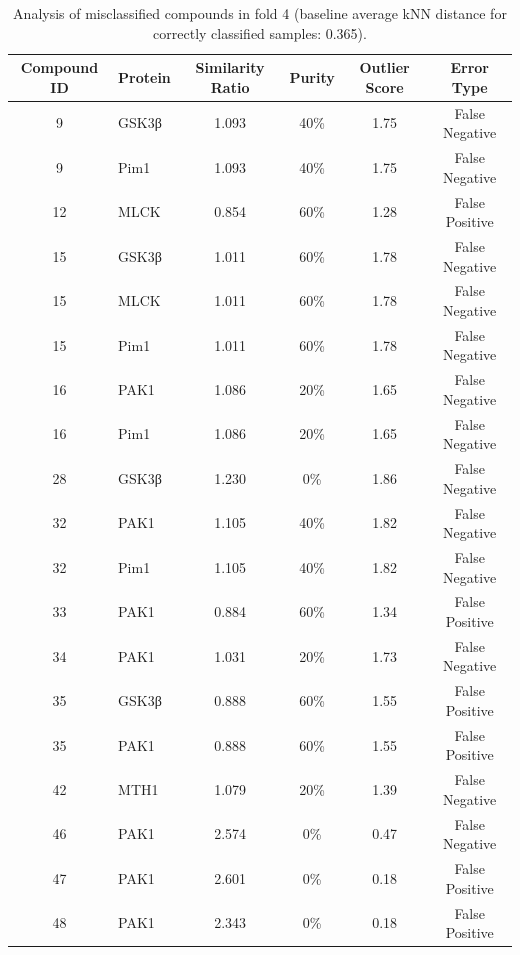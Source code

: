 \documentclass{article}
\newenvironment{smarttabular}[1]{%
    \begin{tabular}{#1}%
}{%
    \end{tabular}%
}
\begin{document}
\begin{table}[H]
    \centering
    \small
    \caption{Analysis of misclassified compounds in fold 4 (baseline average kNN distance for correctly classified samples: 0.365).}
    \label{tab:misclassified_compounds_4}
    \begin{smarttabular}{clcccc}
        \toprule
        \textbf{Compound ID} & \textbf{Protein} & \textbf{Similarity Ratio} & \textbf{Purity} & \textbf{Outlier Score} & \textbf{Error Type} \\
        \midrule
        9 & GSK3β & 1.093 & 40\% & 1.75 & False Negative \\
        9 & Pim1 & 1.093 & 40\% & 1.75 & False Negative \\
        12 & MLCK & 0.854 & 60\% & 1.28 & False Positive \\
        15 & GSK3β & 1.011 & 60\% & 1.78 & False Negative \\
        15 & MLCK & 1.011 & 60\% & 1.78 & False Negative \\
        15 & Pim1 & 1.011 & 60\% & 1.78 & False Negative \\
        16 & PAK1 & 1.086 & 20\% & 1.65 & False Negative \\
        16 & Pim1 & 1.086 & 20\% & 1.65 & False Negative \\
        28 & GSK3β & 1.230 & 0\% & 1.86 & False Negative \\
        32 & PAK1 & 1.105 & 40\% & 1.82 & False Negative \\
        32 & Pim1 & 1.105 & 40\% & 1.82 & False Negative \\
        33 & PAK1 & 0.884 & 60\% & 1.34 & False Positive \\
        34 & PAK1 & 1.031 & 20\% & 1.73 & False Negative \\
        35 & GSK3β & 0.888 & 60\% & 1.55 & False Positive \\
        35 & PAK1 & 0.888 & 60\% & 1.55 & False Positive \\
        42 & MTH1 & 1.079 & 20\% & 1.39 & False Negative \\
        46 & PAK1 & 2.574 & 0\% & 0.47 & False Negative \\
        47 & PAK1 & 2.601 & 0\% & 0.18 & False Positive \\
        48 & PAK1 & 2.343 & 0\% & 0.18 & False Positive \\
        \bottomrule
    \end{smarttabular}
\end{table}
\end{document}
